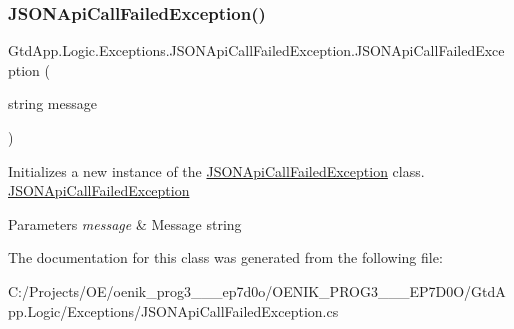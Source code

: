 \subsubsection{\texorpdfstring{J\+S\+O\+N\+Api\+Call\+Failed\+Exception()}{JSONApiCallFailedException()}\hspace{0.1cm}{\footnotesize\ttfamily [2/2]}}
{\footnotesize\ttfamily Gtd\+App.\+Logic.\+Exceptions.\+J\+S\+O\+N\+Api\+Call\+Failed\+Exception.\+J\+S\+O\+N\+Api\+Call\+Failed\+Exception (\begin{DoxyParamCaption}\item[{string}]{message }\end{DoxyParamCaption})}



Initializes a new instance of the \mbox{\hyperlink{class_gtd_app_1_1_logic_1_1_exceptions_1_1_j_s_o_n_api_call_failed_exception}{J\+S\+O\+N\+Api\+Call\+Failed\+Exception}} class. \mbox{\hyperlink{class_gtd_app_1_1_logic_1_1_exceptions_1_1_j_s_o_n_api_call_failed_exception}{J\+S\+O\+N\+Api\+Call\+Failed\+Exception}} 


\begin{DoxyParams}{Parameters}
{\em message} & Message string\\
\hline
\end{DoxyParams}


The documentation for this class was generated from the following file\+:\begin{DoxyCompactItemize}
\item 
C\+:/\+Projects/\+O\+E/oenik\+\_\+prog3\+\_\+\_\+\_\+ep7d0o/\+O\+E\+N\+I\+K\+\_\+\+P\+R\+O\+G3\+\_\+\_\+\_\+\+E\+P7\+D0\+O/\+Gtd\+App.\+Logic/\+Exceptions/J\+S\+O\+N\+Api\+Call\+Failed\+Exception.\+cs\end{DoxyCompactItemize}
